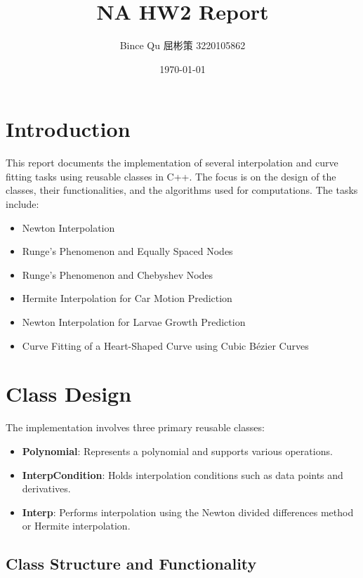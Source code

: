 \documentclass{article}
\title{NA HW2 Report}
\author{Bince Qu 屈彬策 3220105862}
\date{\today}
\begin{document}
\maketitle

\tableofcontents

\section{Introduction}

This report documents the implementation of several interpolation and curve fitting tasks using reusable classes in C++. The focus is on the design of the classes, their functionalities, and the algorithms used for computations. The tasks include:

\begin{itemize}
    \item[A.] Newton Interpolation
    \item[B.] Runge's Phenomenon and Equally Spaced Nodes
    \item[C.] Runge's Phenomenon and Chebyshev Nodes
    \item[D.] Hermite Interpolation for Car Motion Prediction
    \item[E.] Newton Interpolation for Larvae Growth Prediction
    \item[F.] Curve Fitting of a Heart-Shaped Curve using Cubic Bézier Curves
\end{itemize}

\section{Class Design}

The implementation involves three primary reusable classes:

\begin{itemize}
    \item \textbf{Polynomial}: Represents a polynomial and supports various operations.
    \item \textbf{InterpCondition}: Holds interpolation conditions such as data points and derivatives.
    \item \textbf{Interp}: Performs interpolation using the Newton divided differences method or Hermite interpolation.
\end{itemize}

\subsection{Class Structure and Functionality}
\end{document}
